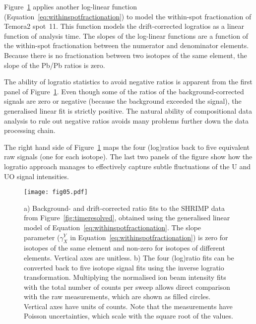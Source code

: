\documentclass{article}
\begin{document}
Figure~\ref{fig:withinspotfractionation} applies another log-linear
function (Equation~\ref{eq:withinspotfractionation}) to model the
within-spot fractionation of Temora2 spot~11. This function models the
drift-corrected logratios as a linear function of analysis time. The
slopes of the log-linear functions are a function of the within-spot
fractionation between the numerator and denominator elements. Because
there is no fractionation between two isotopes of the same element,
the slope of the Pb/Pb ratios is zero.\medskip

The ability of logratio statistics to avoid negative ratios is
apparent from the first panel of
Figure~\ref{fig:withinspotfractionation}. Even though some of the
ratios of the background-corrected signals are zero or negative
(because the background exceeded the signal), the generalised linear
fit is strictly positive. The natural ability of compositional data
analysis to rule out negative ratios avoids many problems further down
the data processing chain.\medskip

The right hand side of Figure~\ref{fig:withinspotfractionation} maps
the four (log)ratios back to five equivalent raw signals (one for each
isotope). The last two panels of the figure show how the logratio
approach manages to effectively capture subtle fluctuations of the U
and UO signal intensities.\medskip

\begin{figure}[!htbp]
  \centering
  \texttt{[image: fig05.pdf]}
  \parbox{\textwidth}{
  \caption{a) Background- and drift-corrected ratio fits to the SHRIMP
    data from Figure~\ref{fig:timeresolved}, obtained using the
    generalised linear model of
    Equation~\ref{eq:withinspotfractionation}. The slope parameter
    ($\gamma_X^Y$ in Equation~\ref{eq:withinspotfractionation}) is
    zero for isotopes of the same element and non-zero for isotopes of
    different elements. Vertical axes are unitless. b) The four
    (log)ratio fits can be converted back to five isotope signal fits
    using the inverse logratio transformation. Multiplying the
    normalised ion beam intensity fits with the total number of counts
    per sweep allows direct comparison with the raw measurements,
    which are shown as filled circles. Vertical axes have units of
    counts. Note that the measurements have Poisson uncertainties,
    which scale with the square root of the values.}
  \label{fig:withinspotfractionation}
  }
\end{figure}
\end{document}
